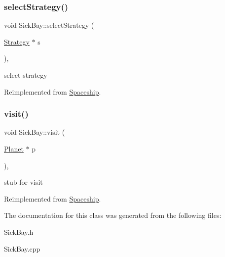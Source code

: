 \subsubsection{\texorpdfstring{select\+Strategy()}{selectStrategy()}}
{\footnotesize\ttfamily void Sick\+Bay\+::select\+Strategy (\begin{DoxyParamCaption}\item[{\hyperlink{classStrategy}{Strategy} $\ast$}]{s }\end{DoxyParamCaption})\hspace{0.3cm}{\ttfamily [inline]}, {\ttfamily [virtual]}}

select strategy 

Reimplemented from \hyperlink{classSpaceship_a93be2d9d2b675ef978d866d4cd7a6524}{Spaceship}.

\mbox{\label{classSickBay_a4f8395f68f93b62e0cc68f6a3bd3af79}} 
\subsubsection{\texorpdfstring{visit()}{visit()}}
{\footnotesize\ttfamily void Sick\+Bay\+::visit (\begin{DoxyParamCaption}\item[{\hyperlink{classPlanet}{Planet} $\ast$}]{p }\end{DoxyParamCaption})\hspace{0.3cm}{\ttfamily [inline]}, {\ttfamily [virtual]}}

stub for visit 

Reimplemented from \hyperlink{classSpaceship}{Spaceship}.



The documentation for this class was generated from the following files\+:\begin{DoxyCompactItemize}
\item 
Sick\+Bay.\+h\item 
Sick\+Bay.\+cpp\end{DoxyCompactItemize}
